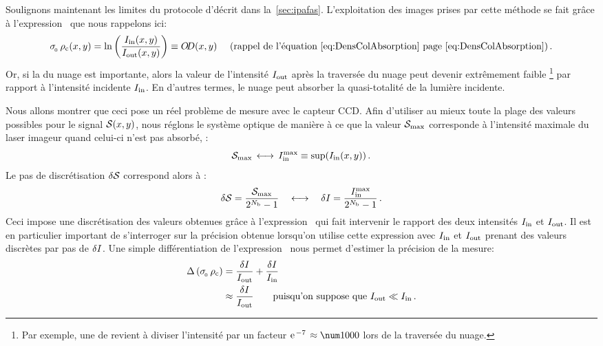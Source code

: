 Soulignons maintenant les limites du protocole d'\ipafas décrit dans la~\autoref{sec:ipafas}. 
L'exploitation des images prises par cette méthode se fait grâce à l'expression~ que nous rappelons ici:
\[
	\seceff \, \denscolxy 
	= 
	\Ln{
	\frac{\Iinxy}{\Ioutxy}
	}
	\equiv \OptDens\xy
	\text{~~~~(rappel de l'équation~\nref{eq:DensColAbsorption} page  \pageref{eq:DensColAbsorption})}
\pointformule
\]
Or, si la \do du nuage est importante, alors la valeur de l'intensité ${{I}_{\rm out}}$ après la traversée du nuage peut devenir extrêmement faible%
%
\footnote{Par exemple, une \do de  revient à diviser l'intensité par un facteur $\expo{-7}\approx\val{1000}$ lors de la traversée du nuage.}
%
 par rapport à l'intensité incidente ${{I}_{\rm in}}$. En d'autres termes, le nuage peut absorber la quasi-totalité de la lumière incidente.

Nous allons montrer que ceci pose un réel problème de mesure avec le capteur CCD. 
Afin d'utiliser au mieux toute la plage des valeurs possibles pour le signal ${\mathcal{S}}(x,y)$,
nous réglons le système optique de manière à ce que la valeur ${\mathcal{S}_{\rm max}}$ corresponde à l'intensité maximale du laser imageur quand celui-ci n'est pas absorbé, \cad:
\[
{\mathcal{S}_{\rm max}} \, \longleftrightarrow \, {{I}_{\rm in}^{\rm max}} \equiv \sup({{{I}_{\rm in}}(x,y)})
\, .
\] 
Le pas de discrétisation ${\delta \mathcal{S}}$ correspond alors à :
\[
{\delta \mathcal{S}} = \frac{{\mathcal{S}_{\rm max}}}{2^{N_{\rm b}}-1} 
\quad \longleftrightarrow \quad 
{\delta {I}} = \frac{{{I}_{\rm in}^{\rm max}}}{2^{N_{\rm b}}-1}
\, .
\]
Ceci impose une discrétisation des valeurs obtenues grâce à l'expression~ qui fait intervenir le rapport des deux intensités ${{I}_{\rm in}}$ et ${{I}_{\rm out}}$. 
Il est en particulier important de s'interroger sur la précision obtenue lorsqu'on utilise cette expression avec ${{I}_{\rm in}}$ et ${{I}_{\rm out}}$ prenant des valeurs discrètes par pas de ${\delta {I}}$. Une simple différentiation de l'expression~ nous permet d'estimer la précision de la mesure:
\begin{align}
\Delta \left( {\sigma_{_{\hspace{-1pt}{0}}}} \, {{\rho_{\rm{c}}}} \right) & = \frac{{\delta {I}}}{{{I}_{\rm out}}}+\frac{{\delta {I}}}{{{I}_{\rm in}}} \nonumber \\
& \approx \frac{{\delta {I}}}{{{I}_{\rm out}}} \qquad \text{puisqu'on suppose que ${{I}_{\rm out}}\ll{{I}_{\rm in}}$} \nonumber
\, .
\end{align}
 
